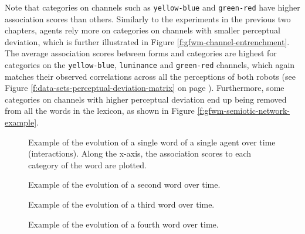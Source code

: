 Note that categories on channels such as \texttt{yellow-blue} and
\texttt{green-red} have higher association scores than others.
Similarly to the experiments in the previous two chapters, agents rely
more on categories on channels with smaller perceptual deviation,
which is further illustrated in Figure
\ref{f:gfwm-channel-entrenchment}. The average association scores
between forms and categories are highest for categories on the
\texttt{yellow-blue}, \texttt{luminance} and \texttt{green-red}
channels, which again matches their observed correlations across all
the perceptions of both robots (see Figure
\ref{f:data-sets-perceptual-deviation-matrix} on page
\pageref{f:data-sets-perceptual-deviation-matrix}). Furthermore, some
categories on channels with higher perceptual deviation end up being
removed from all the words in the lexicon, as shown in Figure
\ref{f:gfwm-semiotic-network-example}.




\startfiguregroup

\begin{figure}[t]
  \caption{Example of the evolution of a single word of a single agent
    over time (interactions). Along the x-axis, the association scores
    to each category of the word are plotted.}
\label{f:qfwm-attribute-scores-1}
\end{figure}

\begin{figure}[t]
  \caption{Example of the evolution of a second word over time.}
  \label{f:qfwm-attribute-scores-2}
\end{figure}

\begin{figure}[t]
  \caption{Example of the evolution of a third word over time.}
  \label{f:qfwm-attribute-scores-3}
\end{figure}

\begin{figure}[t]
  \caption{Example of the evolution of a fourth word over time.}
  \label{f:qfwm-attribute-scores-4}
\end{figure}

\stopfiguregroup

~\\

